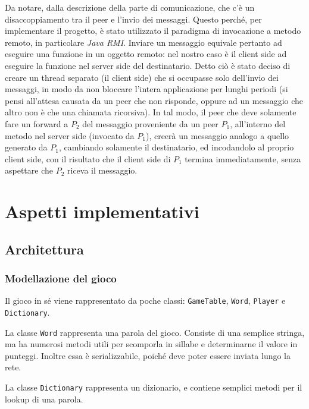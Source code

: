 \documentclass[10.5pt]{article}
\begin{document}
Da notare, dalla descrizione della parte di comunicazione, che c'è un disaccoppiamento tra il peer e l'invio dei messaggi. Questo perché, per implementare il progetto, è stato utilizzato il paradigma di invocazione a metodo remoto, in particolare \textit{Java RMI}. Inviare un messaggio equivale pertanto ad eseguire una funzione in un oggetto remoto: nel nostro caso è il client side ad eseguire la funzione nel server side del destinatario. Detto ciò è stato deciso di creare un thread separato (il client side) che si occupasse solo dell'invio dei messaggi, in modo da non bloccare l'intera applicazione per lunghi periodi (si pensi all'attesa causata da un peer che non risponde, oppure ad un messaggio che altro non è che una chiamata ricorsiva). In tal modo, il peer che deve solamente fare un forward a $P_2$ del messaggio proveniente da un peer $P_1$, all'interno del metodo nel server side (invocato da $P_1$), creerà un messaggio analogo a quello generato da $P_1$, cambiando solamente il destinatario, ed incodandolo al proprio client side, con il risultato che il client side di $P_1$ termina immediatamente, senza aspettare che $P_2$ riceva il messaggio. 


\section{Aspetti implementativi}

\subsection{Architettura}

\subsubsection{Modellazione del gioco}

Il gioco in sé viene rappresentato da poche classi: \texttt{GameTable}, \texttt{Word}, \texttt{Player} e \texttt{Dictionary}.

La classe \texttt{Word} rappresenta una parola del gioco. Consiste di una semplice stringa, ma ha numerosi metodi utili per scomporla in sillabe e determinarne il valore in punteggi. Inoltre essa è serializzabile, poiché deve poter essere inviata lungo la rete.  

La classe \texttt{Dictionary} rappresenta un dizionario, e contiene semplici metodi per il lookup di una parola.
\end{document}
